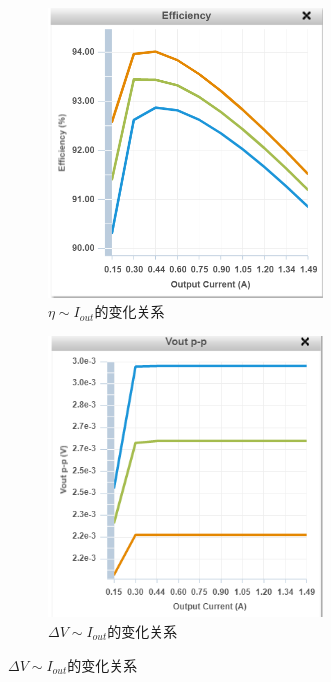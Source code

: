 \documentclass[a4paper, 11pt]{article} %
\begin{document}
\begin{figure}[H]
    \centering
    \begin{minipage}[H]{0.48\textwidth}
        \begin{figure}[H]
            \centering
            \includegraphics[width = 0.8\textwidth]{efficiency-I.png}
            \caption{$\eta \sim I_{out}$的变化关系}
        \end{figure}
    \end{minipage}
    \begin{minipage}[H]{0.48\textwidth}
        \begin{figure}[H]
            \centering
            \includegraphics[width = 0.8\textwidth]{Vpp-I.png}
            \caption{$\Delta V \sim I_{out}$的变化关系}
        \end{figure}
    \end{minipage}
\end{figure}
\end{document}
